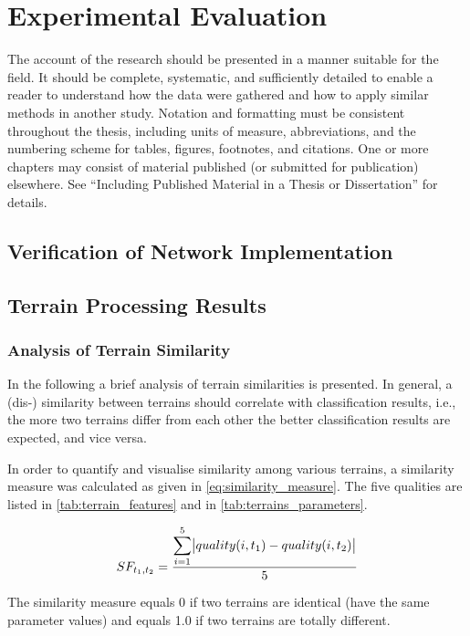 \chapter{Experimental Evaluation} \label{chap:results}

The account of the research should be presented in a manner suitable for the field. It should be complete, systematic, and sufficiently detailed to enable a reader to understand how the data were gathered and how to apply similar methods in another study. Notation and formatting must be consistent throughout the thesis, including units of measure, abbreviations, and the numbering scheme for tables, figures, footnotes, and citations. One or more chapters may consist of material published (or submitted for publication) elsewhere. See “Including Published Material in a Thesis or Dissertation” for details.

\section{Verification of Network Implementation}

\section{Terrain Processing Results}

\subsection{Analysis of Terrain Similarity} \label{ssec:terrains_analysis}
In the following a brief analysis of terrain similarities is presented. In general, a (dis-) similarity between terrains should correlate with classification results, i.e., the more two terrains differ from each other the better classification results are expected, and vice versa.

In order to quantify and visualise similarity among various terrains, a similarity measure was calculated as given in \cref{eq:similarity_measure}. The five qualities are listed in \cref{tab:terrain_features} and in \cref{tab:terrains_parameters}.

\begin{align} \label{eq:similarity_measure}
  SF_{t_1, t_2} = \frac{\displaystyle\sum_{i=1}^{5} \abs{quality(i, t_1) - quality(i, t_2)}}{5}
\end{align} 

The similarity measure equals 0 if two terrains are identical (have the same parameter values) and equals 1.0 if two terrains are totally different.

